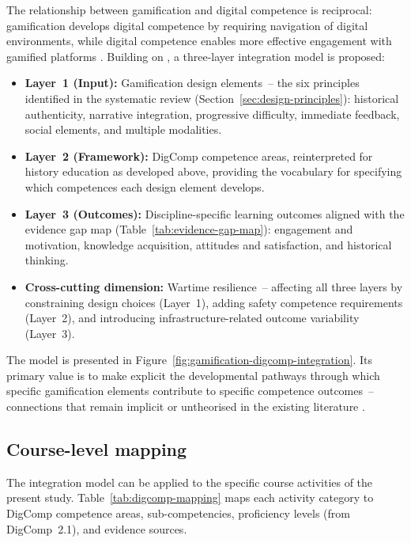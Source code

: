 The relationship between gamification and digital competence is reciprocal: gamification develops digital competence by requiring navigation of digital environments, while digital competence enables more effective engagement with gamified platforms \citep{BarrosoTristan2025, Titova2025cte}. Building on \cite{Titova2025cte}, a three-layer integration model is proposed:

\begin{itemize}
\item \textbf{Layer~1 (Input):} Gamification design elements~-- the six principles identified in the systematic review (Section~\ref{sec:design-principles}): historical authenticity, narrative integration, progressive difficulty, immediate feedback, social elements, and multiple modalities.
\item \textbf{Layer~2 (Framework):} DigComp competence areas, reinterpreted for history education as developed above, providing the vocabulary for specifying which competences each design element develops.
\item \textbf{Layer~3 (Outcomes):} Discipline-specific learning outcomes aligned with the evidence gap map (Table~\ref{tab:evidence-gap-map}): engagement and motivation, knowledge acquisition, attitudes and satisfaction, and historical thinking.
\item \textbf{Cross-cutting dimension:} Wartime resilience~-- affecting all three layers by constraining design choices (Layer~1), adding safety competence requirements (Layer~2), and introducing infrastructure-related outcome variability (Layer~3).
\end{itemize}

The model is presented in Figure~\ref{fig:gamification-digcomp-integration}. Its primary value is to make explicit the developmental pathways through which specific gamification elements contribute to specific competence outcomes~-- connections that remain implicit or untheorised in the existing literature \citep{Deterding2011, Sailer2017, KorniienkoSemerikov2024}.



\subsection{Course-level mapping}

The integration model can be applied to the specific course activities of the present study. Table~\ref{tab:digcomp-mapping} maps each activity category to DigComp competence areas, sub-competencies, proficiency levels (from DigComp~2.1), and evidence sources.

